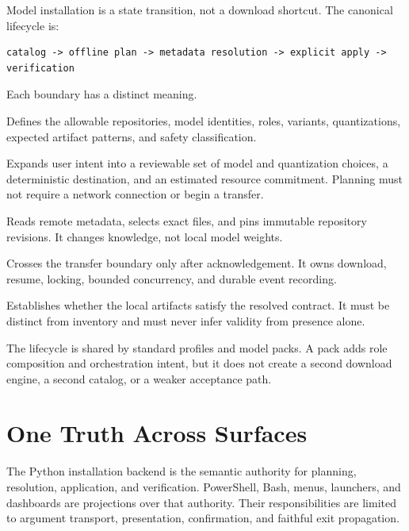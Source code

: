 \documentclass[11pt]{article}
\begin{document}
Model installation is a state transition, not a download shortcut. The
canonical lifecycle is:

\begin{verbatim}
catalog -> offline plan -> metadata resolution -> explicit apply -> verification
\end{verbatim}

Each boundary has a distinct meaning.

\begin{description}[style=nextline,leftmargin=0pt,labelindent=0pt]
  \item[Catalog]
  Defines the allowable repositories, model identities, roles, variants,
  quantizations, expected artifact patterns, and safety classification.

  \item[Offline plan]
  Expands user intent into a reviewable set of model and quantization choices,
  a deterministic destination, and an estimated resource commitment. Planning
  must not require a network connection or begin a transfer.

  \item[Metadata resolution]
  Reads remote metadata, selects exact files, and pins immutable repository
  revisions. It changes knowledge, not local model weights.

  \item[Explicit apply]
  Crosses the transfer boundary only after acknowledgement. It owns download,
  resume, locking, bounded concurrency, and durable event recording.

  \item[Verification]
  Establishes whether the local artifacts satisfy the resolved contract. It
  must be distinct from inventory and must never infer validity from presence
  alone.
\end{description}

The lifecycle is shared by standard profiles and model packs. A pack adds role
composition and orchestration intent, but it does not create a second download
engine, a second catalog, or a weaker acceptance path.

\section{One Truth Across Surfaces}

The Python installation backend is the semantic authority for planning,
resolution, application, and verification. PowerShell, Bash, menus, launchers,
and dashboards are projections over that authority. Their responsibilities are
limited to argument transport, presentation, confirmation, and faithful exit
propagation.
\end{document}
